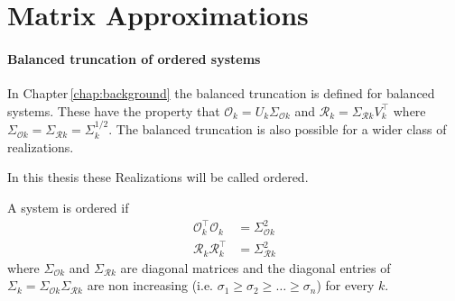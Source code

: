\documentclass[doctype=mastersthesis,BCOR=15mm,biblatex]{ldvbook}%
\DeclareMathOperator{\diag}{diag}
\newcommand{\R}{\mathcal{R}} %
\newcommand{\Ob}{\mathcal{O}} %
\begin{document}
\section{Matrix Approximations}\label{sec:approx}




\paragraph{Balanced truncation of ordered systems}
In Chapter\,\ref{chap:background} the balanced truncation is defined for balanced systems.
These have the property that $\Ob_k = U_k \Sigma_{\Ob k}$ and $\R_k = \Sigma_{\R k} V_k^\top$ where $\Sigma_{\Ob k} = \Sigma_{\R k}=\Sigma_k^{1/2}$.
The balanced truncation is also possible for a wider class of realizations.

In this thesis these Realizations will be called ordered.
\begin{definition}
	A system is ordered if 
	\begin{subequations}
	\begin{align}
		\Ob_k^\top \Ob_k &= \Sigma_ {\Ob k}^2 \label{eq:orderd_obs}\\ %
		\R_k \R_k^\top &= \Sigma_ {\R k}^2 \label{eq:orderd_reach}%
	\end{align}
	\end{subequations}
	where $\Sigma_{\Ob k}$ and $\Sigma_{\R k}$ are diagonal matrices
	and the diagonal entries of $\Sigma_k =\Sigma_{\Ob k}\Sigma_{\R k}$ are non increasing (i.e. $\sigma_1 \geq \sigma_2 \geq \dots \geq \sigma_n$)
    for every $k$.
\end{definition}
\end{document}
